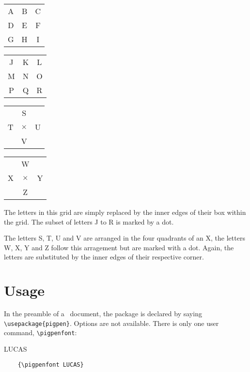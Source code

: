\documentclass[a4paper]{article}
\newcommand\exa{\nopagebreak \begin{flushleft}\smallskip \nopagebreak
                \begin{minipage}[t]{6cm}\sloppy}
\newcommand\exb{\end{minipage}\kern 1cm\begin{minipage}[t]{8cm}\sloppy }
\newcommand\exc{\end{minipage}\kern -3cm \smallskip\end{flushleft}}
\begin{document}
\begin{center}
{\pigpenfont
\begin{minipage}[t]{3cm}%
\begin{tabular}{ccc}
	A&B&C\\
	D&E&F\\
	G&H&I\\
\end{tabular}\end{minipage}%
\begin{minipage}[t]{3cm}%
\begin{tabular}{ccc}
	J&K&L\\
	M&N&O\\
	P&Q&R\\
\end{tabular}\end{minipage}
\begin{minipage}[t]{3cm}%
\begin{tabular}{ccc}
	 &S& \\
	T&$\times$&U\\
	 &V& \\
\end{tabular}\end{minipage}%
\begin{minipage}[t]{3cm}%
\begin{tabular}{ccc}
	  &W&\\
	X&$\times$&Y\\
	  &Z&\\
\end{tabular}\end{minipage}}
\end{center}

The letters in this grid are simply replaced by the inner edges 
of their box within the grid. The subset of letters J to R is marked
by a dot.

The letters S, T, U and V are arranged in the four quadrants of an X,
the letters W, X, Y and Z follow this arragement but are marked with
a dot. Again, the letters are substituted by the inner edges of their
respective corner.

\section{Usage}

In the preamble of a \LaTeXe\ document, the package is declared by
saying \verb|\usepackage{pigpen}|. Options are not available.
There is only one user command, \verb|\pigpenfont|:
\exa
	{\pigpenfont LUCAS}
\exb
	\begin{verbatim}
	{\pigpenfont LUCAS}
	\end{verbatim}
\exc
\end{document}

